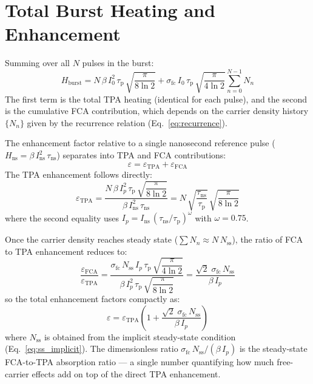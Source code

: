 \documentclass[11pt,a4paper]{article}
\begin{document}
\section{Total Burst Heating and Enhancement}

Summing over all $N$ pulses in the burst:
\begin{equation}
H_\text{burst} = N\,\beta\,I_0^2\,\tau_\text{p}\,\sqrt{\frac{\pi}{8\ln 2}} + \sigma_\text{fc}\,I_0\,\tau_\text{p}\,\sqrt{\frac{\pi}{4\ln 2}} \sum_{n=0}^{N-1} N_n
\label{eq:H_burst}
\end{equation}
The first term is the total TPA heating (identical for each pulse), and the second is the cumulative FCA contribution, which depends on the carrier density history $\{N_n\}$ given by the recurrence relation (Eq.~\ref{eq:recurrence}).

The enhancement factor relative to a single nanosecond reference pulse ($H_\text{ns} = \beta\,I_\text{ns}^2\,\tau_\text{ns}$) separates into TPA and FCA contributions:
\begin{equation}
\varepsilon = \varepsilon_\text{TPA} + \varepsilon_\text{FCA}
\label{eq:enhancement}
\end{equation}
The TPA enhancement follows directly:
\begin{equation}
\varepsilon_\text{TPA} = \frac{N\,\beta\,I_p^2\,\tau_\text{p}\,\sqrt{\dfrac{\pi}{8\ln 2}}}{\beta\,I_\text{ns}^2\,\tau_\text{ns}} = N\,\sqrt{\frac{\tau_\text{ns}}{\tau_\text{p}}}\,\sqrt{\frac{\pi}{8\ln 2}}
\label{eq:eps_tpa}
\end{equation}
where the second equality uses $I_p = I_\text{ns}\,(\tau_\text{ns}/\tau_\text{p})^\omega$ with $\omega = 0.75$.

Once the carrier density reaches steady state ($\sum N_n \approx N\,N_\text{ss}$), the ratio of FCA to TPA enhancement reduces to:
\[
\frac{\varepsilon_\text{FCA}}{\varepsilon_\text{TPA}} = \frac{\sigma_\text{fc}\,N_\text{ss}\,I_p\,\tau_\text{p}\,\sqrt{\dfrac{\pi}{4\ln 2}}}{\beta\,I_p^2\,\tau_\text{p}\,\sqrt{\dfrac{\pi}{8\ln 2}}} = \frac{\sqrt{2}\;\sigma_\text{fc}\,N_\text{ss}}{\beta\,I_p}
\]
so the total enhancement factors compactly as:
\begin{equation}
\boxed{\varepsilon = \varepsilon_\text{TPA}\!\left(1 + \frac{\sqrt{2}\;\sigma_\text{fc}\,N_\text{ss}}{\beta\,I_p}\right)}
\label{eq:eps_total}
\end{equation}
where $N_\text{ss}$ is obtained from the implicit steady-state condition (Eq.~\ref{eq:ss_implicit}). The dimensionless ratio $\sigma_\text{fc}\,N_\text{ss}/(\beta\,I_p)$ is the steady-state FCA-to-TPA absorption ratio --- a single number quantifying how much free-carrier effects add on top of the direct TPA enhancement.
\end{document}

